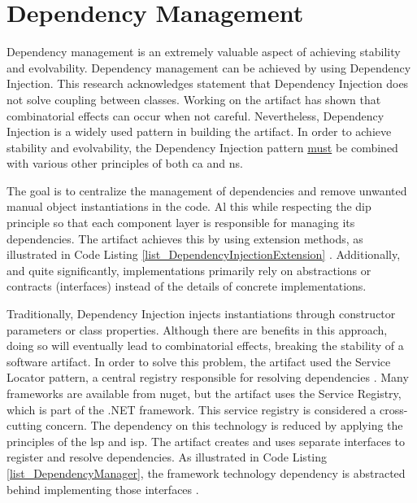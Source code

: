 \section{Dependency Management} Dependency management is an extremely valuable aspect of
achieving stability and evolvability. Dependency management can be achieved by using
Dependency Injection. This research acknowledges \textcite[215]{mannaert_normalized_2016}
statement that Dependency Injection does not solve coupling between classes. Working on
the artifact has shown that combinatorial effects can occur when not careful.
Nevertheless, Dependency Injection is a widely used pattern in building the artifact. In
order to achieve stability and evolvability, the Dependency Injection pattern
\underline{must} be combined with various other principles of both \gls{ca} and \gls{ns}. 

The goal is to centralize the management of dependencies and remove unwanted manual object
instantiations in the code. Al this while respecting the \gls{dip} principle so that each
component layer is responsible for managing its dependencies. The artifact achieves this
by using extension methods, as illustrated in Code Listing
\ref{list_DependencyInjectionExtension}
\parencite{koks_dependencyinjectionextension_2023}. Additionally, and quite significantly,
implementations primarily rely on abstractions or contracts (interfaces) instead of the
details of concrete implementations. 

Traditionally, Dependency Injection injects instantiations through constructor parameters
or class properties. Although there are benefits in this approach, doing so will
eventually lead to combinatorial effects, breaking the stability of a software artifact.
In order to solve this problem, the artifact used the Service Locator pattern, a central
registry responsible for resolving dependencies \parencite{wikipedia_service_2023}. Many
frameworks are available from \gls{nuget}, but the artifact uses the Service Registry,
which is part of the .NET framework. This service registry is considered a cross-cutting
concern. The dependency on this technology is reduced by applying the principles of the
\gls{lsp} and \gls{isp}. The artifact creates and uses separate interfaces to register
\parencite{koks_idependencymanagerinteractor_2023} and resolve
\parencite{koks_idependencyfactoryinteractor_2023} dependencies. As illustrated in Code
Listing \ref{list_DependencyManager}, the framework technology dependency is abstracted
behind implementing those interfaces \parencite{koks_dependencymanagerinteractor_2023}. 

